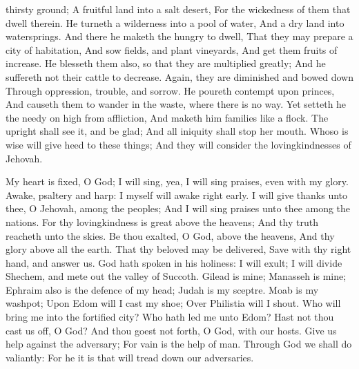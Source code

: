thirsty ground;  A fruitful land into a salt desert, For the wickedness of them that dwell therein.  He turneth a wilderness into a pool of water, And a dry land into watersprings.  And there he maketh the hungry to dwell, That they may prepare a city of habitation,  And sow fields, and plant vineyards, And get them fruits of increase.  He blesseth them also, so that they are multiplied greatly; And he suffereth not their cattle to decrease.  Again, they are diminished and bowed down Through oppression, trouble, and sorrow.  He poureth contempt upon princes, And causeth them to wander in the waste, where there is no way.  Yet setteth he the needy on high from affliction, And maketh him families like a flock.  The upright shall see it, and be glad; And all iniquity shall stop her mouth.  Whoso is wise will give heed to these things; And they will consider the lovingkindnesses of Jehovah. 

My heart is fixed, O God; I will sing, yea, I will sing praises, even with my glory.  Awake, psaltery and harp: I myself will awake right early.  I will give thanks unto thee, O Jehovah, among the peoples; And I will sing praises unto thee among the nations.  For thy lovingkindness is great above the heavens; And thy truth reacheth unto the skies.  Be thou exalted, O God, above the heavens, And thy glory above all the earth.  That thy beloved may be delivered, Save with thy right hand, and answer us.  God hath spoken in his holiness: I will exult; I will divide Shechem, and mete out the valley of Succoth.  Gilead is mine; Manasseh is mine; Ephraim also is the defence of my head; Judah is my sceptre.  Moab is my washpot; Upon Edom will I cast my shoe; Over Philistia will I shout.  Who will bring me into the fortified city? Who hath led me unto Edom?  Hast not thou cast us off, O God? And thou goest not forth, O God, with our hosts.  Give us help against the adversary; For vain is the help of man.  Through God we shall do valiantly: For he it is that will tread down our adversaries. 

